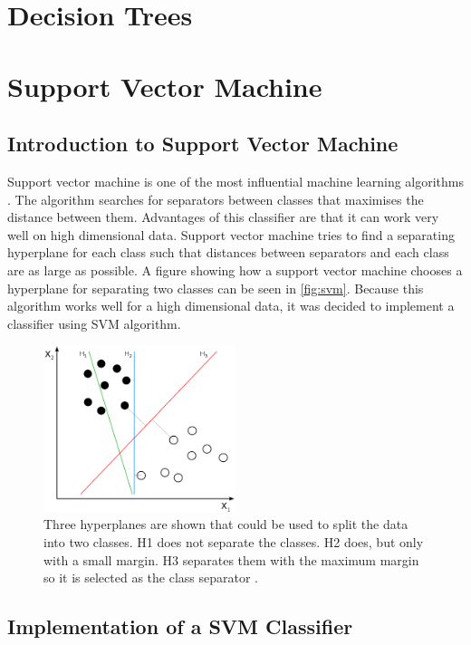 \section{Decision Trees}

\fi

\section{Support Vector Machine}

\subsection{Introduction to Support Vector Machine}

Support vector machine is one of the most influential machine learning algorithms \cite{boser1992training}. The algorithm searches for separators between classes that maximises the distance between them. Advantages of this classifier are that it can work very well on high dimensional data. Support vector machine tries to find a separating hyperplane for each class such that distances between separators and each class are as large as possible. A figure showing how a support vector machine chooses a hyperplane for separating two classes can be seen in \autoref{fig:svm}. Because this algorithm works well for a high dimensional data, it was decided to implement a classifier using SVM algorithm.

\begin{figure}[h]
\centering
\includegraphics[width=0.5\textwidth]{Figures/svm.PNG}
\caption{Three hyperplanes are shown that could be used to split the data into two classes. H1 does not separate the classes. H2 does, but only with a small margin. H3 separates them with the maximum margin so it is selected as the class separator  \cite{wikipedia_2018}.}
\label{fig:svm}
\end{figure}


\subsection{Implementation of a SVM Classifier}

